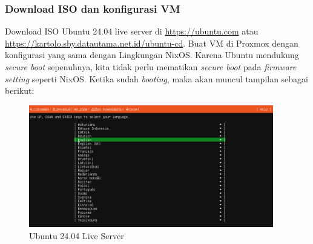 \documentclass[10pt,twoside]{report}
\begin{document}
\begin{adjustwidth}{20pt}{}
	\subsubsection{Download ISO dan konfigurasi VM}
	\begin{adjustwidth}{20pt}{}
		Download ISO Ubuntu 24.04 live server di \url{https://ubuntu.com} atau
		\url{https://kartolo.sby.datautama.net.id/ubuntu-cd}. Buat VM di Proxmox
		dengan konfigurasi yang sama dengan Lingkungan NixOS. Karena Ubuntu mendukung
		\textit{secure boot} sepenuhnya, kita tidak perlu mematikan \textit{secure boot}
		pada \textit{firmware setting} seperti NixOS.
		Ketika sudah \textit{booting}, maka akan muncul tampilan sebagai berikut:
		\newpage
		\begin{figure}[H]
			\begin{center}
				\includegraphics[width=0.95\textwidth]{images/ansible-nix-0.png}
			\end{center}
			\caption{Ubuntu 24.04 Live Server}
		\end{figure}

	\end{adjustwidth}

\end{adjustwidth}
\end{document}
